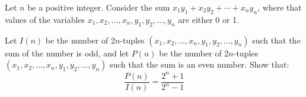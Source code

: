 Let $n$ be a positive integer. Consider the sum $x_1y_1 + x_2y_2 +\cdots + x_ny_n$,  where that values of the variables $x_1, x_2,\ldots, x_n, y_1, y_2,\ldots, y_n$ are either 0 or 1.

Let $I(n)$ be the number of 2$n$-tuples $(x_1, x_2,\ldots, x_n, y_1, y_2,\ldots, y_n)$ such that the sum of the number is odd, and let $P(n)$ be the number of 2$n$-tuples  $(x_1, x_2,\ldots, x_n, y_1, y_2,\ldots, y_n)$ such that the sum is an even number. Show that: \[ \frac{P(n)}{I(n)}=\frac{2^n+1}{2^n-1}  \]